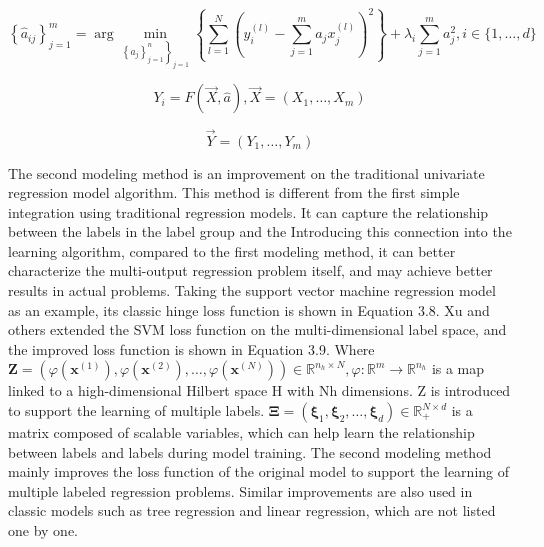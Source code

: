 \documentclass[twoside]{article}
\begin{document}
\begin{equation}
\left\{\hat{a}_{i j}\right\}_{j=1}^{m}=\arg \min _{\left.\left\{a_{j}\right\}_{j=1}^{n}\right\}_{j=1}}\left\{\sum_{l=1}^{N}\left(y_{i}^{(l)}-\sum_{j=1}^{m} a_{j} x_{j}^{(l)}\right)^{2}\right\}+\lambda_{i} \sum_{j=1}^{m} a_{j}^{2}, i \in\{1, \ldots, d\}
\end{equation}

\begin{equation}
Y_{i}=F(\vec{X}, \hat{a}), \vec{X}=\left(X_{1}, \ldots, X_{m}\right)
\end{equation}

\begin{equation}
\vec{Y}=\left(Y_{1}, \ldots, Y_{m}\right)
\end{equation}

The second modeling method is an improvement on the traditional univariate regression model algorithm. This method is different from the first simple integration using traditional regression models. It can capture the relationship between the labels in the label group and the Introducing this connection into the learning algorithm, compared to the first modeling method, it can better characterize the multi-output regression problem itself, and may achieve better results in actual problems.
Taking the support vector machine regression model as an example, its classic hinge loss function is shown in Equation 3.8. Xu\cite{tyz75} and others extended the SVM loss function on the multi-dimensional label space, and the improved loss function is shown in Equation 3.9.
Where $\mathbf{Z}=\left(\varphi\left(\mathbf{x}^{(1)}\right), \varphi\left(\mathbf{x}^{(2)}\right), \ldots, \varphi\left(\mathbf{x}^{(N)}\right)\right) \in \mathbb{R}^{n_{h} \times N}, \varphi: \mathbb{R}^{m} \rightarrow \mathbb{R}^{n_{h}}$ is a map linked to a high-dimensional Hilbert space H with Nh dimensions. Z is introduced to support the learning of multiple labels.
$\boldsymbol{\Xi}=\left(\boldsymbol{\xi}_{1}, \boldsymbol{\xi}_{2}, \ldots, \boldsymbol{\xi}_{d}\right) \in \mathbb{R}_{+}^{N \times d}$ is a matrix composed of scalable variables, which can help learn the relationship between labels and labels during model training.
The second modeling method mainly improves the loss function of the original model to support the learning of multiple labeled regression problems. Similar improvements are also used in classic models such as tree regression and linear regression, which are not listed one by one.
\end{document}
